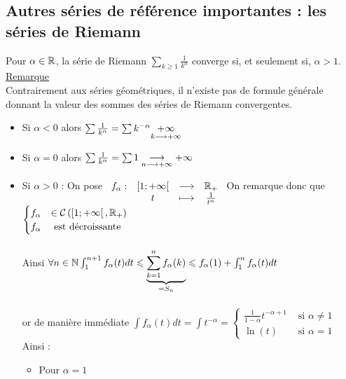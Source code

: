 \subsection{Autres séries de référence importantes : les séries de Riemann}
\begin{defprop}
   Pour \(\alpha  \in  \mathbb{R}\), la série de Riemann \(\sum_{k\geq 1} \frac{1}{k^{\alpha}}\)  converge si, et seulement si, \(\alpha  > 1\).\\
    \underline{Remarque}\\
    Contrairement aux séries géométriques, il n’existe pas de formule générale donnant la valeur des sommes des séries de Riemann convergentes. 
\end{defprop}

\begin{dem}
    \begin{itemize}
        \item Si \(\alpha < 0\) alors \(\sum \frac{1}{k^{\alpha}} = \sum k^{-\alpha} \underset{k \longrightarrow +\infty}{+\infty}\)
        \item Si \(\alpha = 0\) alors \(\sum \frac{1}{k^{\alpha}} = \sum 1 \underset{n \longrightarrow +\infty}{\longrightarrow} +\infty \)
        \item Si \(\alpha >0\) :
            On pose \(\begin{array}[t]{cccc}f_{\alpha} : & \left[1;+\infty\right[ & \longrightarrow & \mathbb{R}_+ \\ & t & \longmapsto & \frac{1}{t^{\alpha}}\end{array}\) On remarque donc que \(\begin{cases}
                f_{\alpha} &\in \mathcal{C}\left(\left[1;+\infty\right[,\mathbb{R}_+\right)\\
                f_{\alpha} &\text{ est décroissante}
            \end{cases}\)\\~\\
            Ainsi \(\forall n \in \mathbb{N} \int_{1}^{n+1}f_{\alpha}(t)dt\leqslant \underbrace{ \sum_{k=1}^n f_{\alpha}(k)}_{ = S_n} \leqslant f_{\alpha}(1) + \int_{1}^n f_{\alpha}(t)dt\)\\~\\
            or de manière immédiate \(\int f_{\alpha}(t)dt = \int t^{-\alpha} = \begin{cases}
                \frac{1}{1-\alpha}t^{-\alpha +1} &\text{ si } \alpha \neq 1\\
                \ln(t) &\text{ si } \alpha = 1 
            \end{cases}\)
            Ainsi :
            \begin{itemize}
                \item Pour \(\alpha = 1\)\\~\\

\end{itemize}
\end{itemize}
\end{dem}
